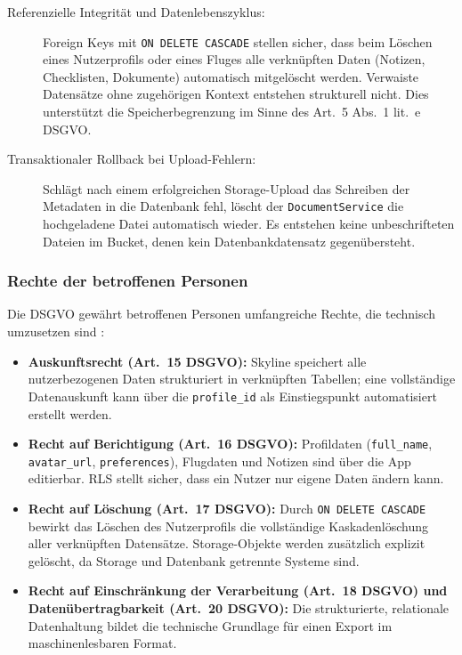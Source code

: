 \begin{description}
  \item[Referenzielle Integrität und Datenlebenszyklus:]
    Foreign Keys mit \texttt{ON DELETE CASCADE} stellen sicher,
    dass beim Löschen eines Nutzerprofils oder eines Fluges
    alle verknüpften Daten (Notizen, Checklisten, Dokumente)
    automatisch mitgelöscht werden.
    Verwaiste Datensätze ohne zugehörigen Kontext entstehen
    strukturell nicht.
    Dies unterstützt die Speicherbegrenzung im Sinne des
    Art.~5 Abs.~1 lit.~e DSGVO.

  \item[Transaktionaler Rollback bei Upload-Fehlern:]
    Schlägt nach einem erfolgreichen Storage-Upload das
    Schreiben der Metadaten in die Datenbank fehl,
    löscht der \texttt{DocumentService} die hochgeladene
    Datei automatisch wieder.
    Es entstehen keine unbeschrifteten Dateien im Bucket,
    denen kein Datenbankdatensatz gegenübersteht.
\end{description}

\subsubsection{Rechte der betroffenen Personen}

Die DSGVO gewährt betroffenen Personen umfangreiche Rechte,
die technisch umzusetzen sind \cite{dsb}:

\begin{itemize}
  \item \textbf{Auskunftsrecht (Art.~15 DSGVO):}
        Skyline speichert alle nutzerbezogenen Daten strukturiert
        in verknüpften Tabellen; eine vollständige Datenauskunft
        kann über die \texttt{profile\_id} als Einstiegspunkt
        automatisiert erstellt werden.

  \item \textbf{Recht auf Berichtigung (Art.~16 DSGVO):}
        Profildaten (\texttt{full\_name}, \texttt{avatar\_url},
        \texttt{preferences}), Flugdaten und Notizen sind
        über die App editierbar.
        RLS stellt sicher, dass ein Nutzer nur eigene Daten
        ändern kann.

  \item \textbf{Recht auf Löschung (Art.~17 DSGVO):}
        Durch \texttt{ON DELETE CASCADE} bewirkt das Löschen
        des Nutzerprofils die vollständige Kaskadenlöschung
        aller verknüpften Datensätze.
        Storage-Objekte werden zusätzlich explizit gelöscht,
        da Storage und Datenbank getrennte Systeme sind.

  \item \textbf{Recht auf Einschränkung der Verarbeitung
        (Art.~18 DSGVO) und Datenübertragbarkeit (Art.~20 DSGVO):}
        Die strukturierte, relationale Datenhaltung bildet die
        technische Grundlage für einen Export im maschinenlesbaren
        Format.
\end{itemize}

